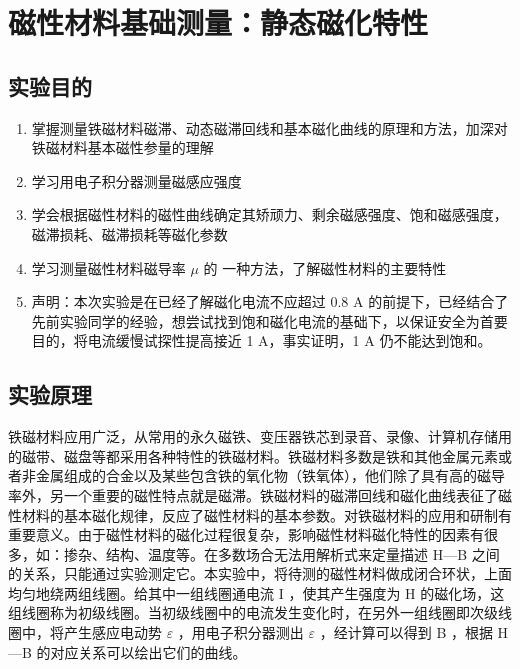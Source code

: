 \chapter{磁性材料基础测量：静态磁化特性}
\section{实验目的}
    \begin{enumerate}
        \item 掌握测量铁磁材料磁滞、动态磁滞回线和基本磁化曲线的原理和方法，加深对铁磁材料基本磁性参量的理解 
        \item 学习用电子积分器测量磁感应强度
        \item 学会根据磁性材料的磁性曲线确定其矫顽力、剩余磁感强度、饱和磁感强度，磁滞损耗、磁滞损耗等磁化参数
        \item 学习测量磁性材料磁导率 $\mu$ 的 一种方法，了解磁性材料的主要特性
        \item 声明：本次实验是在已经了解磁化电流不应超过 0.8 A 的前提下，已经结合了先前实验同学的经验，想尝试找到饱和磁化电流的基础下，以保证安全为首要目的，将电流缓慢试探性提高接近 1 A，事实证明，1 A 仍不能达到饱和。
    \end{enumerate}
\section{实验原理}%
    铁磁材料应用广泛，从常用的永久磁铁、变压器铁芯到录音、录像、计算机存储用的磁带、磁盘等都采用各种特性的铁磁材料。铁磁材料多数是铁和其他金属元素或者非金属组成的合金以及某些包含铁的氧化物（铁氧体），他们除了具有高的磁导率外，另一个重要的磁性特点就是磁滞。铁磁材料的磁滞回线和磁化曲线表征了磁性材料的基本磁化规律，反应了磁性材料的基本参数。对铁磁材料的应用和研制有重要意义。由于磁性材料的磁化过程很复杂，影响磁性材料磁化特性的因素有很多，如：掺杂、结构、温度等。在多数场合无法用解析式来定量描述 H—B 之间的关系，只能通过实验测定它。本实验中，将待测的磁性材料做成闭合环状，上面均匀地绕两组线圈。给其中一组线圈通电流 I ，使其产生强度为 H 的磁化场，这组线圈称为初级线圈。当初级线圈中的电流发生变化时，在另外一组线圈即次级线圈中，将产生感应电动势 $\varepsilon$ ，用电子积分器测出 $\varepsilon$ ，经计算可以得到 B ，根据 H—B 的对应关系可以绘出它们的曲线。
